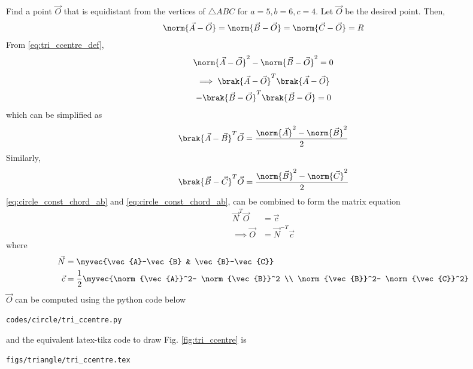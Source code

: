 \item Find a point $\vec{O}$ that is equidistant from the vertices of $\triangle ABC$ for $a = 5, b = 6, c = 4$.
%
\solution Let $\vec{O}$ be the desired point.  Then,
\begin{align}
\label{eq:tri_ccentre_def}
\norm{\vec{A}-\vec{O}} = \norm{\vec{B}-\vec{O}} = 
\norm{\vec{C}-\vec{O}} = R
\end{align}
From \eqref{eq:tri_ccentre_def},
\begin{align}
\label{eq:circle_const_AB}
\norm{\vec{A}-\vec{O}}^2 - \norm{\vec{B}-\vec{O}}^2  = 0
\end{align}
\begin{multline}
\implies \brak{\vec{A}-\vec{O}}^T\brak{\vec{A}-\vec{O}} 
\\
- \brak{\vec{B}-\vec{O}}^T\brak{\vec{B}-\vec{O}} = 0
\end{multline}
%
which can be simplified as
\begin{align}
\label{eq:circle_const_chord_ab}
\brak{\vec{A}-\vec{B}}^T\vec{O} =   \frac{\norm{\vec{A}}^2- \norm{\vec{B}}^2}{2}
\end{align}
Similarly,
\begin{align}
\label{eq:circle_const_chord_bc}
\brak{\vec{B}-\vec{C}}^T\vec{O} =   \frac{\norm{\vec{B}}^2- \norm{\vec{C}}^2}{2}
\end{align}
%
\eqref{eq:circle_const_chord_ab} and \eqref{eq:circle_const_chord_ab}, can be combined to form the matrix equation 
%
\begin{align}
\vec{N}^T\vec{O} &= \vec{c}
\\
\implies \vec{O} &= \vec{N}^{-T} \vec{c}
\label{eq:circle_const_chord_mat}
\end{align}
%
where 
%
\begin{align}
\vec{N} &= \myvec{\vec{A}-\vec{B} & \vec{B}-\vec{C}}
\\
\vec{c} &= \frac{1}{2}\myvec{\norm{\vec{A}}^2- \norm{\vec{B}}^2 \\ \norm{\vec{B}}^2- \norm{\vec{C}}^2}
\end{align}
%
$\vec{O}$ can be computed using 
%
the python code below
%
\begin{lstlisting}
codes/circle/tri_ccentre.py
\end{lstlisting}
%
and the equivalent latex-tikz code to draw Fig. \ref{fig:tri_ccentre} is
%
\begin{lstlisting}
figs/triangle/tri_ccentre.tex
\end{lstlisting}
%
\fi
  \iffalse
  \begin{align}
\brak{\vec{A}-
	  \vec{B}}^{\top}\brak{\vec{A}-\vec{C}} = \brak{\cos \theta_1-\cos \theta_2} \brak{\cos \theta_1-\cos \theta_3}+\brak{\sin \theta_1-\sin \theta_2}
  \brak{\sin \theta_1-\sin \theta_3}
  \end{align}
  \fi
